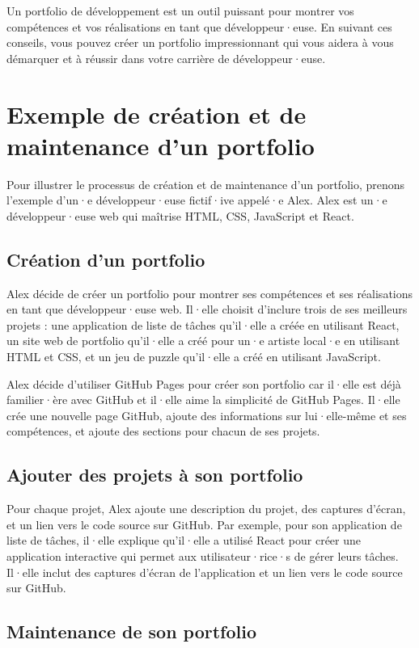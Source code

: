 Un portfolio de développement est un outil puissant pour montrer vos compétences et vos réalisations en tant que développeur·euse. En suivant ces conseils, vous pouvez créer un portfolio impressionnant qui vous aidera à vous démarquer et à réussir dans votre carrière de développeur·euse.

\section{Exemple de création et de maintenance d'un portfolio}

Pour illustrer le processus de création et de maintenance d'un portfolio, prenons l'exemple d'un·e développeur·euse fictif·ive appelé·e Alex. Alex est un·e développeur·euse web qui maîtrise HTML, CSS, JavaScript et React.

\subsection{Création d'un portfolio}

Alex décide de créer un portfolio pour montrer ses compétences et ses réalisations en tant que développeur·euse web. Il·elle choisit d'inclure trois de ses meilleurs projets : une application de liste de tâches qu'il·elle a créée en utilisant React, un site web de portfolio qu'il·elle a créé pour un·e artiste local·e en utilisant HTML et CSS, et un jeu de puzzle qu'il·elle a créé en utilisant JavaScript.

Alex décide d'utiliser GitHub Pages pour créer son portfolio car il·elle est déjà familier·ère avec GitHub et il·elle aime la simplicité de GitHub Pages. Il·elle crée une nouvelle page GitHub, ajoute des informations sur lui·elle-même et ses compétences, et ajoute des sections pour chacun de ses projets.

\subsection{Ajouter des projets à son portfolio}

Pour chaque projet, Alex ajoute une description du projet, des captures d'écran, et un lien vers le code source sur GitHub. Par exemple, pour son application de liste de tâches, il·elle explique qu'il·elle a utilisé React pour créer une application interactive qui permet aux utilisateur·rice·s de gérer leurs tâches. Il·elle inclut des captures d'écran de l'application et un lien vers le code source sur GitHub.

\subsection{Maintenance de son portfolio}

